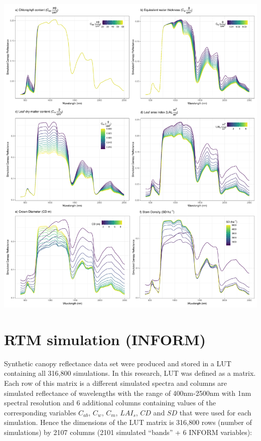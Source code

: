 \documentclass[a4paper, twoside]{templates/ociamthesis}
\let\origfigure\figure
\let\endorigfigure\endfigure
\renewenvironment{figure}[1][2] {
    \expandafter\origfigure\expandafter[H]
} {
    \endorigfigure
}
\begin{document}
\begin{figure}

{\centering \includegraphics[height=0.8\textheight]{./figures/sensitivity_results} 

}

\caption{Effects of varying the chosen parameters on the simulated spectra}\label{fig:fsens}
\end{figure}

\newpage

\hypertarget{rtm-simulation-inform-1}{%
\section{RTM simulation (INFORM)}\label{rtm-simulation-inform-1}}

Synthetic canopy reflectance data set were produced and stored in a LUT containing all 316,800 simulations. In this research, LUT was defined as a matrix. Each row of this matrix is a different simulated spectra and columns are simulated reflectance of wavelengths with the range of 400nm-2500nm with 1nm spectral resolution and 6 additional columns containing values of the corresponding variables \(C_{ab}\), \(C_{w}\), \(C_{m}\), \(LAI_{s}\), \(CD\) and \(SD\) that were used for each simulation. Hence the dimensions of the LUT matrix is 316,800 rows (number of simulations) by 2107 columns (2101 simulated ``bands'' + 6 INFORM variables):
\end{document}
